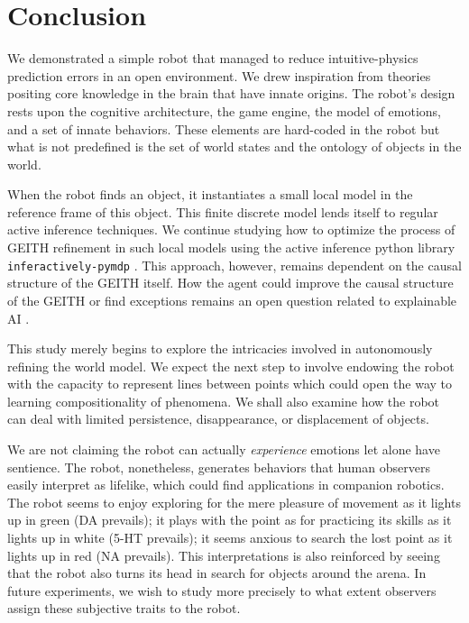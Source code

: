\documentclass[runningheads]{llncs}
\begin{document}

\section{Conclusion}

We demonstrated a simple robot that managed to reduce intuitive-physics prediction errors in an open environment. 
We drew inspiration from theories positing core knowledge in the brain that have innate origins.
The robot's design rests upon the cognitive architecture, the game engine, the model of emotions, and a set of innate behaviors.
These elements are hard-coded in the robot but what is not predefined is the set of world states and the ontology of objects in the world.

When the robot finds an object, it instantiates a small local model in the reference frame of this object. 
This finite discrete model lends itself to regular active inference techniques. 
We continue studying how to optimize the process of GEITH refinement in such local models using the active inference python library  \texttt{inferac\-tively-pymdp} \cite{Heins2022}.
This approach, however, remains dependent on the causal structure of the GEITH itself.
How the agent could improve the causal structure of the GEITH or find exceptions remains an open question related to explainable AI \cite{thorisson_explanation_2021}.

This study merely begins to explore the intricacies involved in autonomously refining the world model.
We expect the next step to involve endowing the robot with the capacity to represent lines between points which could open the way to learning compositionality of phenomena. 
We shall also examine how the robot can deal with limited persistence, disappearance, or displacement of objects. 

We are not claiming the robot can actually \textit{experience} emotions let alone have sentience. 
The robot, nonetheless, generates behaviors that human observers easily interpret as lifelike, which could find applications in companion robotics.
The robot seems to enjoy exploring for the mere pleasure of movement as it lights up in green (DA prevails); 
it plays with the point as for practicing its skills as it lights up in white (5-HT prevails); 
it seems anxious to search the lost point as it lights up in red (NA prevails). 
This interpretations is also reinforced by seeing that the robot also turns its head in search for objects around the arena.
In future experiments, we wish to study more precisely to what extent observers assign these subjective traits to the robot.
\end{document}
